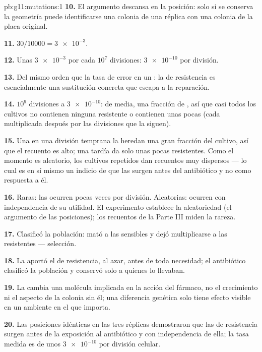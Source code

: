 \begin{solution}{pb:g11:mutations:1}
\textbf{10.} El argumento descansa en la posición: solo si se conserva
la geometría puede identificarse una colonia de una réplica con una
colonia de la placa original.

\textbf{11.} $30/\num{10000} = \num{3e-3}$.

\textbf{12.} Unas $\num{3e-3}$  por cada $10^7$ divisiones:
$\num{3e-10}$ por división.

\textbf{13.} Del mismo orden que la tasa de error en un : la
 de resistencia es esencialmente una sustitución concreta que
escapa a la reparación.

\textbf{14.} $10^9$ divisiones a $\num{3e-10}$: de media, una fracción
de , así que casi todos los cultivos no contienen ninguna
 resistente o contienen unas pocas (cada  multiplicada
después por las divisiones que la siguen).

\textbf{15.} Una  en una división temprana la heredan una gran
fracción del cultivo, así que el recuento es alto; una tardía da solo
unas pocas  resistentes. Como el momento es aleatorio, los
cultivos repetidos dan recuentos muy dispersos --- lo cual es en sí
mismo un indicio de que las  surgen antes del antibiótico y
no como respuesta a él.

\textbf{16.} Raras: las  ocurren pocas veces por división.
Aleatorias: ocurren con independencia de su utilidad. El experimento
establece la aleatoriedad (el argumento de las posiciones); los
recuentos de la Parte III miden la rareza.

\textbf{17.} Clasificó la población: mató a las  sensibles y
dejó multiplicarse a las resistentes --- selección.

\textbf{18.} La  aportó el  de resistencia, al azar, antes
de toda necesidad; el antibiótico clasificó la población y conservó
solo a quienes lo llevaban.

\textbf{19.} La  cambia una molécula implicada en la acción del
fármaco, no el crecimiento ni el aspecto de la colonia sin él; una
diferencia genética solo tiene efecto visible en un ambiente en el que
importa.

\textbf{20.} Las posiciones idénticas en las tres réplicas demostraron
que las  de resistencia surgen antes de la exposición al
antibiótico y con independencia de ella; la tasa medida es de unos
$\num{3e-10}$ por división celular.
\end{solution}
